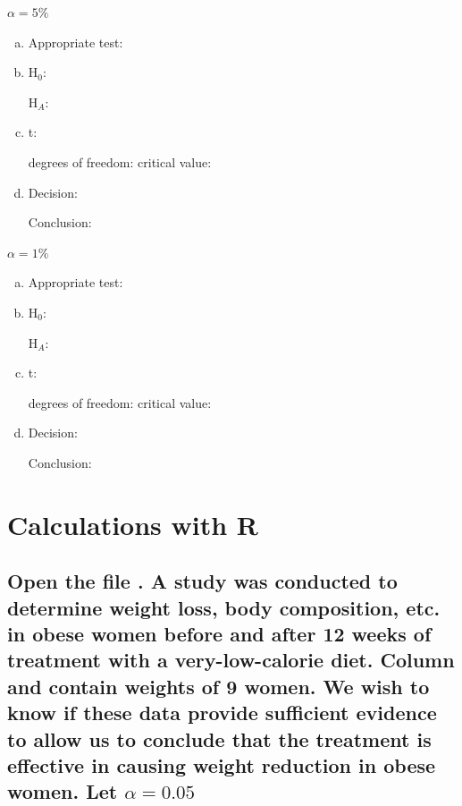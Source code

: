 	\begin{minipage}{0.45\textwidth}
	$\alpha=5\%$
	
		\begin{enumerate}[a)]
		\item Appropriate test: \hrulefill
		\item H$_0:$	 \hrulefill

			 H$_A$:	 \hrulefill
		\item t: 	 \hrulefill

			degrees of freedom: \hrulefill  \quad 
			critical value: \hrulefill
		\item Decision: 	 \hrulefill

				Conclusion: \hrulefill
		\end{enumerate}
	\end{minipage}
	\hfill
	\begin{minipage}{0.45\textwidth}
	$\alpha=1\%$
		
		\begin{enumerate}[a)]
		\item Appropriate test: \hrulefill
		\item H$_0:$	 \hrulefill

			 H$_A$:	 \hrulefill
		\item t: 	 \hrulefill

			degrees of freedom: \hrulefill  \quad 
			critical value: \hrulefill

		\item Decision: 	 \hrulefill

				Conclusion: \hrulefill
		\end{enumerate}
	\end{minipage}


\section{Calculations with R}

\subsection{Open the file . A study was conducted to determine weight loss, body composition, etc. in obese women before and after 12 weeks of treatment with a very-low-calorie diet. Column  and  contain weights of 9 women. We wish to know if these data provide sufficient evidence to allow us to conclude that the treatment is effective in causing weight reduction in obese women. Let $\alpha= 0.05$}

